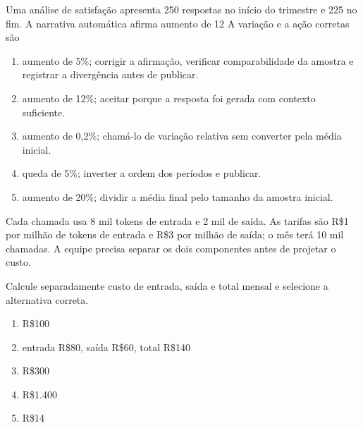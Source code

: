 \TextoBase Uma análise de satisfação apresenta 250 respostas no início do trimestre e 225 no fim. A narrativa automática afirma aumento de 12%
\FonteDidatica
\Comando A variação e a ação corretas são
\begin{enumerate}[label=\Alph*)]
\item aumento de 5\%; corrigir a afirmação, verificar comparabilidade da amostra e registrar a divergência antes de publicar.
\item aumento de 12\%; aceitar porque a resposta foi gerada com contexto suficiente.
\item aumento de 0,2\%; chamá-lo de variação relativa sem converter pela média inicial.
\item queda de 5\%; inverter a ordem dos períodos e publicar.
\item aumento de 20\%; dividir a média final pelo tamanho da amostra inicial.
\end{enumerate}

\TextoBase

Cada chamada usa 8 mil tokens de entrada e 2 mil de saída. As tarifas são R\$1 por milhão de tokens de entrada e R\$3 por milhão de saída; o mês terá 10 mil chamadas. A equipe precisa separar os dois componentes antes de projetar o custo.

\FonteDidatica

\Comando Calcule separadamente custo de entrada, saída e total mensal e selecione a alternativa correta.

\begin{enumerate}[label=\Alph*)]

\item R\$100

\item entrada R\$80, saída R\$60, total R\$140

\item R\$300

\item R\$1.400

\item R\$14

\end{enumerate}

